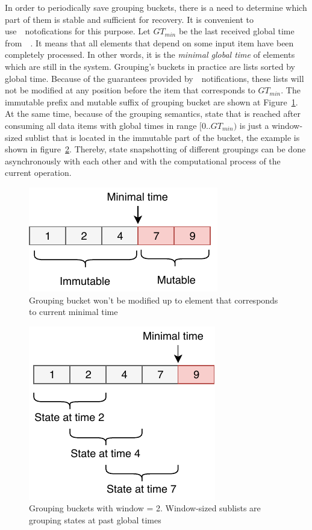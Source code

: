 In order to periodically save grouping buckets, there is a need to determine which part of them is stable and sufficient for recovery. It is convenient to use~\Acker\ notofications for this purpose. Let $GT_{min}$ be the last received global time from~\Acker\ . It means that all elements that depend on some input item have been completely processed. In other words, it is the {\em minimal global time} of elements which are still in the system.  Grouping's buckets in practice are lists sorted by global time. Because of the guarantees provided by~\Acker\ notifications, these lists will not be modified at any position before the item that corresponds to $GT_{min}$. The immutable prefix and mutable suffix of grouping bucket are shown at Figure~\ref{immutable}. At the same time, because of the grouping semantics, state that is reached after consuming all data items with global times in range $[0..GT_{min})$ is just a window-sized sublist that is located in the immutable part of the bucket, the example is shown in figure~\ref{substate}. Thereby, state snapshotting of different groupings can be done asynchronously with each other and with the computational process of the current operation. 

\begin{figure}[htbp]
  \centering
  \includegraphics[width=.3\textwidth]{pics/immutable}
  \caption{Grouping bucket won't be modified up to element that corresponds to current minimal time}
  \label {immutable}
\end{figure}

\begin{figure}[htbp]
  \centering
  \includegraphics[width=.3\textwidth]{pics/substate}
  \caption{Grouping buckets with window = 2. Window-sized sublists are grouping states at past global times}
  \label {substate}
\end{figure}

